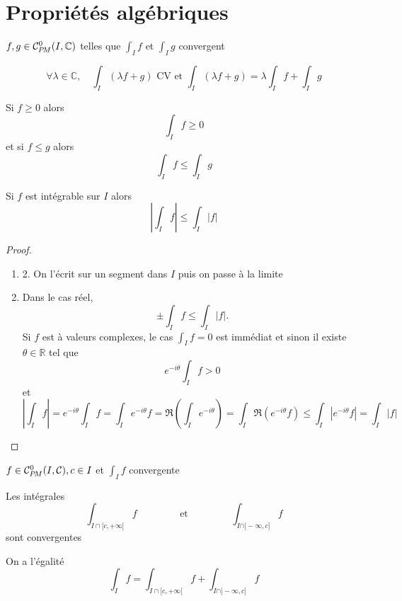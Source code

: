 \section{Propriétés algébriques}

\begin{prop}
    \Hyp $f,g\in\CPM(I, \mathbb C)$ telles que $\displaystyle \int_If$ et $\displaystyle \int_Ig$ convergent
    \begin{concenum}
    \item \[
            \forall \lambda\in\mathbb C, \quad \int_I(\lambda f+g)\text{ CV  et }\int_I(\lambda f+g)=\lambda\int_If+\int_Ig
        \]
    \item Si $f\geq 0$ alors \[
            \int_If\geq 0
        \]
        et si $f\leq g$ alors \[
            \int_If\leq \int_Ig
        \]
    \item Si $f$ est intégrable sur $I$ alors \[
            \left| \int_If \right|\leq \int_I|f|
        \]
    \end{concenum}
\end{prop}

\begin{proof}~
    \begin{enumerate}
        \item 2. On l'écrit sur un segment dans $I$ puis on passe à la limite
        \setcounter{enumi}{2}
        \item Dans le cas réel, \[
                \pm\int_If\leq \int_I|f|.
            \]
            Si $f$ est à valeurs complexes, le cas $\displaystyle\int_If=0$ est immédiat et sinon il existe $\theta\in\mathbb R$ tel que \[
                e^{-i\theta}\int_If>0
            \]
            et \[
                \left| \int_I f \right|=e^{-i\theta}\int_If=\int_Ie^{-i\theta}f=\Re \left( \int_Ie^{-i\theta} \right)=\int_I\Re(e^{-i\theta}f)\leq \int_I|e^{-i\theta}f|=\int_I|f|
            \]
    \end{enumerate}
\end{proof}

\needspace{5cm}
\begin{prop}
    \Hyp $f\in\CPM(I, \mathcal C), c\in I$ et $\displaystyle\int_If$ convergente
    \begin{concenum}
        \item Les intégrales \[
                \int_{I\cap [c, +\infty[}f\qquad \qquad \text{ et }\qquad \qquad \int_{I\cap ]-\infty, c]}f
            \]
            sont convergentes
        \item On a l'égalité \[
                \int_If=\int_{I\cap [c, +\infty[}f+\int_{I\cap ]-\infty, c]}f
            \]
    \end{concenum}
\end{prop}

